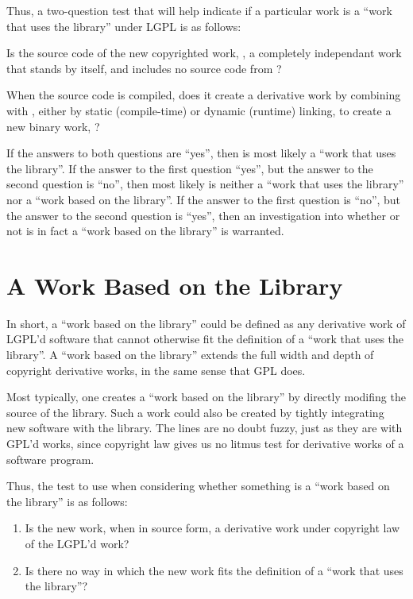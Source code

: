 \documentclass[12pt]{report}
\begin{document}
Thus, a two-question test that will help indicate if a particular work is
a ``work that uses the library'' under LGPL is as follows:

\begin{emumerate}

\item Is the source code of the new copyrighted work, \worki{}, a
  completely independant work that stands by itself, and includes no
  source code from \workl{}?

\item When the source code is compiled, does it create a derivative work
  by combining with \workl{}, either by static (compile-time) or dynamic
  (runtime) linking, to create a new binary work, \lplusi{}?
\end{emumerate}

If the answers to both questions are ``yes'', then \worki{} is most likely
a ``work that uses the library''.  If the answer to the first question
``yes'', but the answer to the second question is ``no'', then most likely
\worki{} is neither a ``work that uses the library'' nor a ``work based on
the library''.  If the answer to the first question is ``no'', but the
answer to the second question is ``yes'', then an investigation into
whether or not \worki{} is in fact a ``work based on the library'' is
warranted.

\section{A Work Based on the Library}

In short, a ``work based on the library'' could be defined as any
derivative work of LGPL'd software that cannot otherwise fit the
definition of a ``work that uses the library''.  A ``work based on the
library'' extends the full width and depth of copyright derivative works,
in the same sense that GPL does.

Most typically, one creates a ``work based on the library'' by directly
modifing the source of the library.  Such a work could also be created by
tightly integrating new software with the library.  The lines are no doubt
fuzzy, just as they are with GPL'd works, since copyright law gives us no
litmus test for derivative works of a software program.

Thus, the test to use when considering whether something is a ``work
based on the library'' is as follows:

\begin{enumerate}

\item Is the new work, when in source form, a derivative work under
  copyright law of the LGPL'd work?

\item Is there no way in which the new work fits the definition of a
  ``work that uses the library''?
\end{enumerate}
\end{document}
